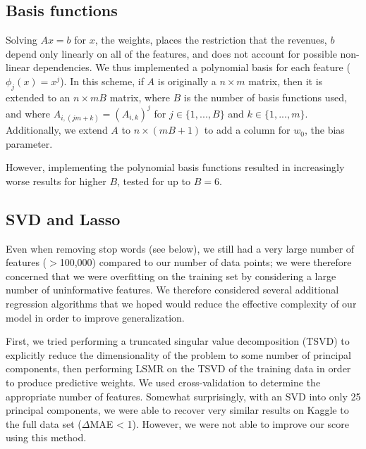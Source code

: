 \documentclass[11pt]{amsart}
\begin{document}
\subsection{Basis functions}
Solving $Ax=b$ for $x$, the weights, places the restriction that the revenues, $b$ depend only linearly on all of the features, and does not account for possible non-linear dependencies. We thus implemented a polynomial basis for each feature ($\phi_j(x)=x^j$). In this scheme, if $A$ is originally a $n\times m$ matrix, then it is extended to an $n \times mB$ matrix, where $B$ is the number of basis functions used, and where $A_{i,(jm+k)}=(A_{i,k})^j$ for $j\in\{1,...,B\}$ and $k\in\{1,...,m\}$. Additionally, we extend $A$ to $n\times (mB+1)$ to add a column for $w_0$, the bias parameter.

However, implementing the polynomial basis functions resulted in increasingly worse results for higher $B$, tested for up to $B=6$.

\subsection{SVD and Lasso}

Even when removing stop words (see below), we still had a very large number of features ($>$100,000) compared to our number of data points; we were therefore concerned that we were overfitting on the training set by considering a large number of uninformative features.  We therefore considered several additional regression algorithms that we hoped would reduce the effective complexity of our model in order to improve generalization. 

First, we tried performing a truncated singular value decomposition (TSVD) to explicitly reduce the dimensionality of the problem to some number of principal components, then performing LSMR on the TSVD of the training data in order to produce predictive weights. We used cross-validation to determine the appropriate number of features. Somewhat surprisingly, with an SVD into only 25 principal components, we were able to recover very similar results on Kaggle to the full data set ($\Delta$MAE < 1). However, we were not able to improve our score using this method.
\end{document}
